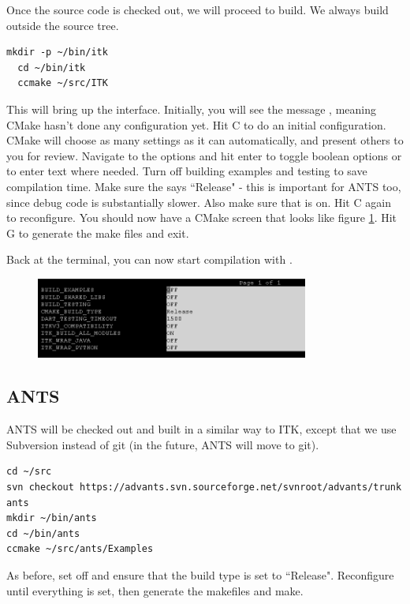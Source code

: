 \documentclass{InsightArticle}
\begin{document}
Once the source code is checked out, we will proceed to build. We always build outside the source tree.
\begin{lstlisting}[style=bash]
  mkdir -p ~/bin/itk
  cd ~/bin/itk
  ccmake ~/src/ITK
\end{lstlisting}
This will bring up the  interface. Initially, you will see the message , meaning CMake hasn't done any configuration yet. Hit C to do an initial configuration. CMake will choose as many settings as it can automatically, and present others to you for review. Navigate to the options and hit enter to toggle boolean options or to enter text where needed.  Turn off building examples and testing to save compilation time. Make sure the  says ``Release" - this is important for ANTS too, since debug code is substantially slower. Also make sure that  is on. Hit C again to reconfigure. You should now have a CMake screen that looks like figure \ref{fig:itkCCMake}. Hit G to generate the make files and exit. 

Back at the terminal, you can now start compilation with .

\begin{figure}
\includegraphics[width=0.8\textwidth]{figures/itk_ccmake.png} 
\label{fig:itkCCMake}
\end{figure}


\subsection{ANTS}

ANTS will be checked out and built in a similar way to ITK, except that we use Subversion instead of git (in the future, ANTS will move to git).
\begin{lstlisting}[style=bash]
cd ~/src
svn checkout https://advants.svn.sourceforge.net/svnroot/advants/trunk ants
mkdir ~/bin/ants
cd ~/bin/ants
ccmake ~/src/ants/Examples
\end{lstlisting}
As before, set  off and ensure that the build type is set to ``Release". Reconfigure until everything is set, then generate the makefiles and make.
\end{document}

